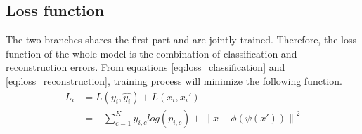 \subsection{Loss function}
The two branches shares the first part and are jointly trained. Therefore, the loss function of the whole model is the combination of classification and reconstruction errors. From equations \ref{eq:loss_classification} and \ref{eq:loss_reconstruction}, training process will minimize the following function.  
\begin{equation}
     \begin{split}
         L_i &= L(y_i, \hat{y_i}) + L(x_i, {x_i}') \\
             &= -\sum_{c=1}^{K}{y_{i,c}log(p_{i,c})} + \left \| x - \phi(\psi(x')) \right \|^2
    \end{split}
    \end{equation}